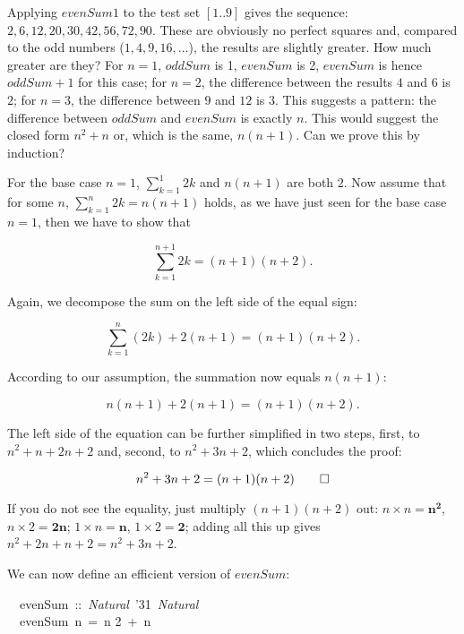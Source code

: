 \documentclass{scrreprt}
\newcommand{\texfamily}{\fontfamily{cmtex}\selectfont}
\begin{document}
Applying $evenSum1$ to the test set $[1..9]$
gives the sequence:
$2, 6, 12, 20, 30, 42, 56, 72, 90$.
These are obviously no perfect squares and,
compared to the odd numbers 
($1, 4, 9, 16, \dots$),
the results are slightly greater.
How much greater are they?
For $n = 1$, $oddSum$ is 1, $evenSum$ is 2,
$evenSum$ is hence $oddSum + 1$ for this case;
for $n = 2$, the difference between the results $4$ and $6$
is $2$;
for $n = 3$, the difference between $9$ and $12$ is $3$.
This suggests a pattern: 
the difference between $oddSum$ and $evenSum$ is exactly $n$.
This would suggest the closed form $n^2 + n$ 
or, which is the same, $n(n+1)$.
Can we prove this by induction?

For the base case $n = 1$, 
$\sum_{k=1}^{1}{2k}$ and $n(n + 1)$
are both $2$.
Now assume that for some $n$,
$\sum_{k=1}^{n}2k = n(n + 1)$
holds, as we have just seen for the base case $n = 1$,
then we have to show that 

\begin{equation}
\sum_{k=1}^{n+1}2k = (n + 1)(n + 2).
\end{equation}

Again, we decompose the sum on the left side of the equal sign:

\begin{equation}
\sum_{k=1}^{n}{(2k)} + 2(n + 1) = (n+1)(n+2).
\end{equation}

According to our assumption, the summation now equals $n(n+1)$:

\begin{equation}
n(n+1) + 2(n + 1) = (n+1)(n+2).
\end{equation}

The left side of the equation can be further simplified 
in two steps, first, to 
$n^2 + n + 2n + 2$ and, second, to
$n^2 + 3n + 2$,
which concludes the proof:

\begin{equation}
n^2 + 3n + 2 = (n+1)(n+2)\qed
\end{equation}

If you do not see the equality,
just multiply $(n+1)(n+2)$ out: 
$n \times n = \mathbf{n^2}$, 
$n \times 2 = \mathbf{2n}$;
$1 \times n = \mathbf{n}$, 
$1 \times 2 = \mathbf{2}$;
adding all this up gives $n^2 + 2n + n + 2 = n^2 + 3n + 2$.

We can now define an efficient version of $evenSum$:

\begin{tabbing}\texfamily
~~evenSum~::~{\itshape Natural}~\char'31~{\itshape Natural}\\
\texfamily ~~evenSum~n~=~n 2~+~n
\end{tabbing}
\end{document}
